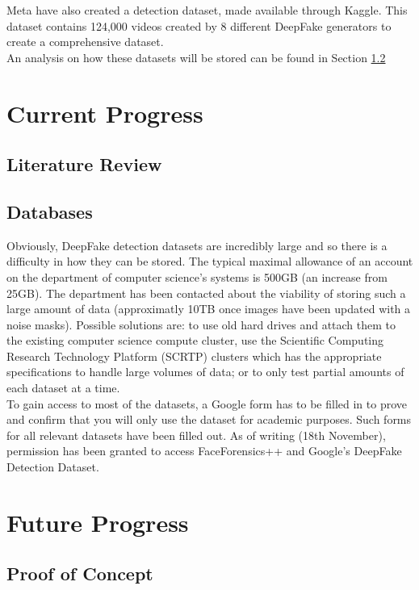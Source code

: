 \documentclass{article}
\begin{document}
Meta have also created a detection dataset\cite{DFDC2020}, made available through Kaggle\cite{kagglemeta}. This dataset contains 124,000 videos created by 8 different DeepFake generators to create a comprehensive dataset.\\

An analysis on how these datasets will be stored can be found in Section \ref{sec:databases}

\section{Current Progress}

\subsection{Literature Review}

\subsection{Databases} \label{sec:databases}

Obviously, DeepFake detection datasets are incredibly large and so there is a difficulty in how they can be stored. The typical maximal allowance of an account on the department of computer science's systems is 500GB (an increase from 25GB)\cite{dcsquota}. The department has been contacted about the viability of storing such a large amount of data (approximatly 10TB once images have been updated with a noise masks). Possible solutions are: to use old hard drives and attach them to the existing computer science compute cluster, use the  Scientific Computing Research Technology Platform (SCRTP) clusters which has the appropriate specifications to handle large volumes of data; or to only test partial amounts of each dataset at a time.\\

To gain access to most of the datasets, a Google form has to be filled in to prove and confirm that you will only use the dataset for academic purposes. Such forms for all relevant datasets have been filled out. As of writing (18th November), permission has been granted to access FaceForensics++ and Google's DeepFake Detection Dataset.

\section{Future Progress}
\subsection{Proof of Concept}
\end{document}
